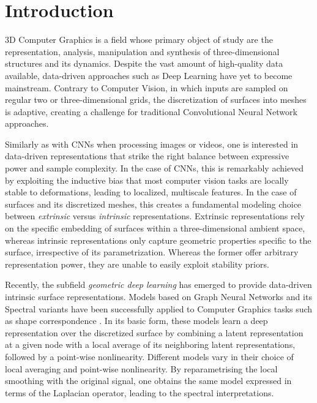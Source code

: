 \section{Introduction}


3D Computer Graphics is a field whose primary object 
of study are the representation, analysis, manipulation and synthesis of three-dimensional structures and its dynamics. 
Despite the vast amount of high-quality data available, data-driven approaches such as Deep Learning 
have yet to become mainstream. Contrary to Computer Vision, in which inputs are sampled on regular 
two or three-dimensional grids, the discretization of surfaces into meshes is adaptive, creating a challenge 
for traditional Convolutional Neural Network approaches. 

Similarly as with CNNs when processing images or videos, one is interested in data-driven 
representations that strike the right balance between expressive power and sample complexity. 
In the case of CNNs, this is remarkably achieved by exploiting the inductive bias that most computer 
vision tasks are locally stable to deformations, leading to localized, multiscale features. 
In the case of surfaces and its discretized meshes, this creates a fundamental modeling choice between \emph{extrinsic} versus \emph{intrinsic} representations. 
Extrinsic representations rely on the specific embedding of surfaces within a three-dimensional ambient space, 
whereas intrinsic representations only capture geometric properties specific to the surface, irrespective of 
its parametrization. Whereas the former offer arbitrary representation power, they are unable to easily exploit stability 
priors. 

Recently, the subfield \emph{geometric deep learning} has emerged to provide 
data-driven intrinsic surface representations. Models based on Graph Neural Networks \cite{gnn1} and its Spectral 
variants \cite{spectr1, spectr2, spectr3} have been successfully applied to Computer Graphics tasks such 
as shape correspondence \cite{monet}. In its basic form, these models learn a deep representation 
over the discretized surface by combining a latent representation at a given node with a local average 
of its neighboring latent representations, followed by a point-wise nonlinearity.
 Different models vary in their choice of local averaging and point-wise nonlinearity. By reparametrising 
 the local smoothing with the original signal, one obtains the same model expressed in terms of the 
 Laplacian operator, leading to the spectral interpretations.

